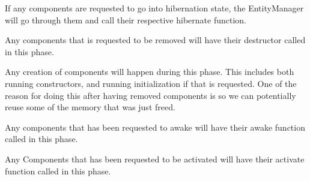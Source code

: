 If any components are requested to go into hibernation state, the EntityManager will go through them and call their respective hibernate function.

Any components that is requested to be removed will have their destructor called in this phase.

Any creation of components will happen during this phase. This includes both running constructors, and running initialization if that is requested.
One of the reason for doing this after having removed components is so we can potentially reuse some of the memory that was just freed.

Any components that has been requested to awake will have their awake function called in this phase.

Any Components that has been requested to be activated will have their activate function called in this phase.
